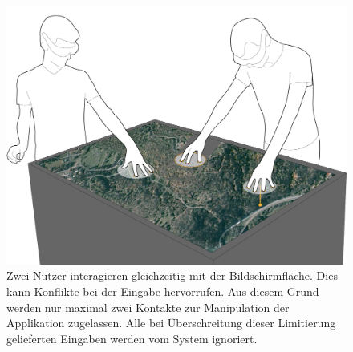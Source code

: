 \begin{figure}
	\begin{center}
		\includegraphics[width=12cm]{img/drei_kontakte.pdf}
	\end{center}
	\caption{Zwei Nutzer interagieren gleichzeitig mit der Bildschirmfläche. Dies kann Konflikte bei der Eingabe hervorrufen. Aus diesem Grund werden nur maximal zwei Kontakte zur Manipulation der Applikation zugelassen. Alle bei Überschreitung dieser Limitierung gelieferten Eingaben werden vom System ignoriert.}
	\label{fig:drei_kontakte}
\end{figure}

